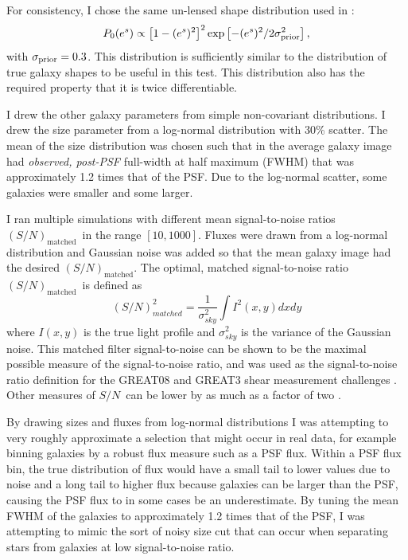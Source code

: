 \documentclass[usegraphicx,usenatbib]{mn2e}
\newcommand{\sn}{$S/N$}
\newcommand{\Msn}{$(S/N)_{\textrm{matched}}$}
\newcommand{\lognormscatt}{30}
\begin{document}
For consistency, I chose the same un-lensed shape distribution
used in \cite{ba14}:
\begin{equation}
P_0(e^s)\propto \left[1-(e^s)^2\right]^2 \exp\left[-(e^s)^2/2\sigma_{\rm prior}^2\right],
\end{equation}
with $\sigma_{\rm prior}=0.3$. This distribution is sufficiently similar to the
distribution of true galaxy shapes to be useful in this test.  This
distribution also has the required property that it is twice differentiable.

I drew the other galaxy parameters from simple non-covariant distributions.  I
drew the size parameter from a log-normal distribution with \lognormscatt\%
scatter.  The mean of the size distribution was chosen such that in the average
galaxy image had {\it observed, post-PSF} full-width at half maximum (FWHM)
that was approximately 1.2 times that of the PSF.  Due to the log-normal
scatter, some galaxies were smaller and some larger.

I ran multiple simulations with different mean signal-to-noise ratios \Msn\ in the
range $[10,1000]$.  Fluxes were drawn from a log-normal distribution and
Gaussian noise was added so that the mean galaxy image had the desired 
\Msn.  The optimal, matched signal-to-noise ratio \Msn\ is defined as
\begin{equation}
    (S/N)^2_{matched} = \frac{1}{\sigma^2_{sky}} \int I^2(x,y) dx dy
\end{equation}
where $I(x,y)$ is the true light profile and $\sigma_{sky}^2$ is the variance
of the Gaussian noise.  This matched filter signal-to-noise can be shown to be
the maximal possible measure of the signal-to-noise ratio, and was used as the
signal-to-noise ratio definition for the GREAT08 and GREAT3 shear measurement
challenges \citep{BridleGREAT08,great3}.  Other measures of \sn\ can be lower
by as much as a factor of two \citep{great3}.

By drawing sizes and fluxes from log-normal distributions I was attempting to
very roughly approximate a selection that might occur in real data, for example
binning galaxies by a robust flux measure such as a PSF flux.  Within a PSF
flux bin, the true distribution of flux would have a small tail to lower values
due to noise and a long tail to higher flux because galaxies can be larger than
the PSF, causing the PSF flux to in some cases be an underestimate.  By tuning
the mean FWHM of the galaxies to approximately 1.2 times that of the PSF, I was
attempting to mimic the sort of noisy size cut that can occur when 
separating stars from galaxies at low signal-to-noise ratio.
\end{document}
